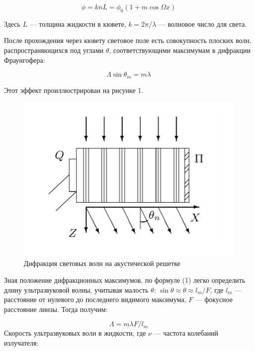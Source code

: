 	\begin{equation}\label{}
	\phi  = k n L = \phi_0 (1 + m \cos \Omega x)
	\end{equation}
	
	Здесь $ L $ --- толщина жидкости в кювете, $ k = 2 \pi / \lambda $ --- волновое число для света.
	
	После прохождения через кювету световое поле есть совокупность плоских волн, распространяющихся под углами $ \theta $, соответствующими максимумам в дифракции Фраунгофера:
	
	\begin{equation}\label{}	
	\Lambda \sin \theta_m = m \lambda
	\end{equation}
	
	Этот эффект проиллюстрирован на рисунке 1.
	\begin{figure}[H]
		\centering	
		\includegraphics[scale = 0.3]{images/pic_1.png}
		\caption{Дифракция световых волн на акустической решетке}
		\label{diff}
	\end{figure}
	
	Зная положение дифракционных максимумов, по формуле (1) легко определить длину ультразвуковой волны, учитывая малость $ \theta $: $ \sin \theta \approx \theta \approx l_m /F  $, где $ l_m $ --- расстояние от нулевого до последнего видимого максимума, $ F $ --- фокусное расстояние линзы. Тогда получим:
	
	\begin{equation}\label{}
	\Lambda = m \lambda F/ l_m 
	\end{equation}
	Скорость ультразвуковых волн в жидкости, где $ \nu $ --- частота колебаний излучателя:
	

